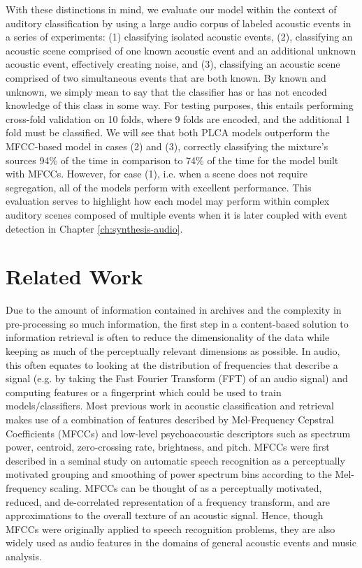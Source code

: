 \documentclass[a4paper,10pt,final]{ThesisStyle}
\begin{document}
With these distinctions in mind, we evaluate our model within the context of auditory classification by using a large audio corpus of labeled acoustic events in a series of experiments: (1) classifying isolated acoustic events, (2), classifying an acoustic scene comprised of one known acoustic event and an additional unknown acoustic event, effectively creating noise, and (3), classifying an acoustic scene comprised of two simultaneous events that are both known.  By known and unknown, we simply mean to say that the classifier has or has not encoded knowledge of this class in some way.  For testing purposes, this entails performing cross-fold validation on 10 folds, where 9 folds are encoded, and the additional 1 fold must be classified.  We will see that both PLCA models outperform the MFCC-based model in cases (2) and (3), correctly classifying the mixture's sources 94\% of the time in comparison to 74\% of the time for the model built with MFCCs.  However, for case (1), i.e. when a scene does not require segregation, all of the models perform with excellent performance.  This evaluation serves to highlight how each model may perform within complex auditory scenes composed of multiple events when it is later coupled with event detection in Chapter \ref{ch:synthesis-audio}.  


\section{Related Work}

Due to the amount of information contained in archives and the complexity in pre-processing so much information, the first step in a content-based solution to information retrieval is often to reduce the dimensionality of the data while keeping as much of the perceptually relevant dimensions as possible.  In audio, this often equates to looking at the distribution of frequencies that describe a signal (e.g. by taking the Fast Fourier Transform (FFT) of an audio signal) and computing features or a fingerprint which could be used to train models/classifiers.  Most previous work in acoustic classification and retrieval makes use of a combination of features described by Mel-Frequency Cepstral Coefficients (MFCCs) and low-level psychoacoustic descriptors \cite{Temko2007,Guo2003a,McKinney2003,Allamanche2001} such as spectrum power, centroid, zero-crossing rate, brightness, and pitch.  MFCCs were first described in a seminal study on automatic speech recognition \cite{Davis1980} as a perceptually motivated grouping and smoothing of power spectrum bins according to the Mel-frequency scaling.  MFCCs can be thought of as a perceptually motivated, reduced, and de-correlated representation of a frequency transform, and are approximations to the overall texture of an acoustic signal.  Hence, though MFCCs were originally applied to speech recognition problems, they are also widely used as audio features in the domains of general acoustic events \cite{Temko2007} and music \cite{Pampalk2006a,McKinney2003} analysis.  
\end{document}

